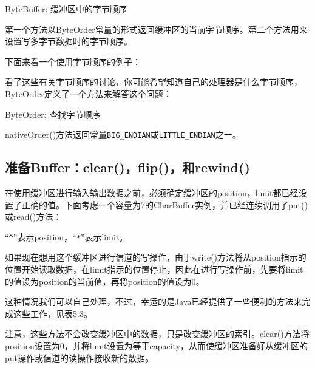 		ByteBuffer: 缓冲区中的字节顺序 

		

		第一个方法以ByteOrder常量的形式返回缓冲区的当前字节顺序。第二个方法用来设置写多字节数据时的字节顺序。 

		下面来看一个使用字节顺序的例子： 

		

		看了这些有关字节顺序的讨论，你可能希望知道自己的处理器是什么字节顺序，ByteOrder定义了一个方法来解答这个问题： 

		ByteOrder: 查找字节顺序 

		

		nativeOrder()方法返回常量\verb|BIG_ENDIAN|或\verb|LITTLE_ENDIAN|之一。 
	
	\subsection{准备Buffer：clear()，flip()，和rewind()}

		在使用缓冲区进行输入输出数据之前，必须确定缓冲区的position，limit都已经设置了正确的值。下面考虑一个容量为7的CharBuffer实例，并已经连续调用了put()或read()方法： 

		“\verb|^|”表示position，“\verb|*|”表示limit。

		

		如果现在想用这个缓冲区进行信道的写操作，由于write()方法将从position指示的位置开始读取数据，在limit指示的位置停止，因此在进行写操作前，先要将limit的值设为position的当前值，再将position的值设为0。 

		

		这种情况我们可以自己处理，不过，幸运的是Java已经提供了一些便利的方法来完成这些工作，见表5.3。 

		注意，这些方法不会改变缓冲区中的数据，只是改变缓冲区的索引。clear()方法将position设置为0，并将limit设置为等于capacity，从而使缓冲区准备好从缓冲区的put操作或信道的读操作接收新的数据。 

		

